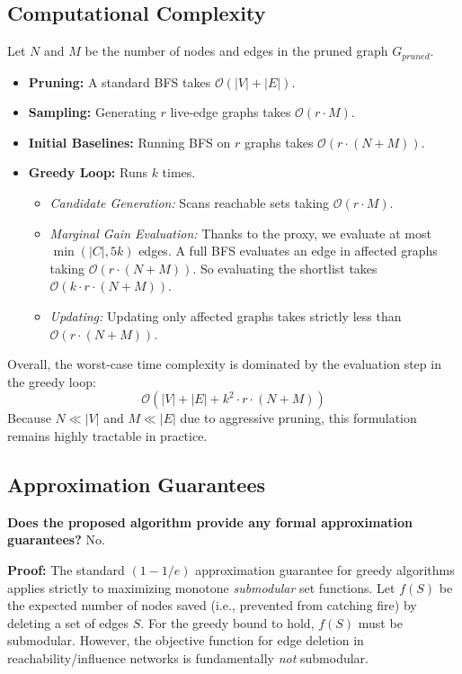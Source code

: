 \documentclass[11pt]{article}
\begin{document}
\subsection*{Computational Complexity}
Let $N$ and $M$ be the number of nodes and edges in the pruned graph $G_{pruned}$.
\begin{itemize}
    \item \textbf{Pruning:} A standard BFS takes $\mathcal{O}(|V| + |E|)$.
    \item \textbf{Sampling:} Generating $r$ live-edge graphs takes $\mathcal{O}(r \cdot M)$.
    \item \textbf{Initial Baselines:} Running BFS on $r$ graphs takes $\mathcal{O}(r \cdot (N + M))$.
    \item \textbf{Greedy Loop:} Runs $k$ times.
    \begin{itemize}
        \item \textit{Candidate Generation:} Scans reachable sets taking $\mathcal{O}(r \cdot M)$.
        \item \textit{Marginal Gain Evaluation:} Thanks to the proxy, we evaluate at most $\min(|C|, 5k)$ edges. A full BFS evaluates an edge in affected graphs taking $\mathcal{O}(r \cdot (N + M))$. So evaluating the shortlist takes $\mathcal{O}(k \cdot r \cdot (N + M))$.
        \item \textit{Updating:} Updating only affected graphs takes strictly less than $\mathcal{O}(r \cdot (N + M))$.
    \end{itemize}
\end{itemize}
Overall, the worst-case time complexity is dominated by the evaluation step in the greedy loop:
$$\mathcal{O}\left(|V| + |E| + k^2 \cdot r \cdot (N + M)\right)$$
Because $N \ll |V|$ and $M \ll |E|$ due to aggressive pruning, this formulation remains highly tractable in practice.

\subsection*{Approximation Guarantees}
\textbf{Does the proposed algorithm provide any formal approximation guarantees?} No.

\textbf{Proof:} The standard $(1 - 1/e)$ approximation guarantee for greedy algorithms applies strictly to maximizing monotone \textit{submodular} set functions. Let $f(S)$ be the expected number of nodes saved (i.e., prevented from catching fire) by deleting a set of edges $S$. For the greedy bound to hold, $f(S)$ must be submodular. However, the objective function for edge deletion in reachability/influence networks is fundamentally \textit{not} submodular.
\end{document}
